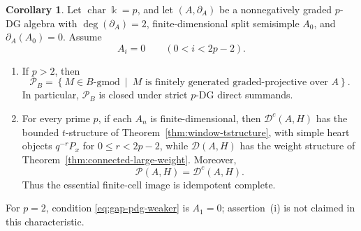 \documentclass[11pt]{article}
\theoremstyle{definition}
\newtheorem{cor}[thm]{Corollary}
\numberwithin{equation}{section}
\newcommand{\kk}{\Bbbk}
\newcommand{\Tcat}{\mathcal{P}(A,H)}
\newcommand{\Dc}{\mathcal{D}^c(A,H)}
\newcommand{\Der}{\mathcal{D}}
\begin{document}
\begin{cor}\label{cor:gap-pdg-weaker}
Let $\operatorname{char}\kk=p$, and let $(A,\partial_A)$ be a nonnegatively graded $p$-DG algebra with $\deg(\partial_A)=2$, finite-dimensional split semisimple $A_0$, and $\partial_A(A_0)=0$. Assume
\begin{equation}\label{eq:gap-pdg-weaker}
 A_i=0\qquad(0<i<2p-2).
\end{equation}
\begin{enumerate}
\item[(i)] If $p>2$, then
$$
\mathcal P_B
=
\left\{
M\in B\text{-gmod}\ \middle|\ 
M \text{ is finitely generated graded-projective over }A
\right\}.
$$
In particular, $\mathcal P_B$ is closed under strict $p$-DG direct summands.

\item[(ii)] For every prime $p$, if each $A_n$ is finite-dimensional, then
$\Dc$ has the bounded $t$-structure of
Theorem~\ref{thm:window-tstructure}, with simple heart objects
$q^{-r}P_x$ for $0\le r<2p-2$, while $\Der(A,H)$ has the weight
structure of Theorem~\ref{thm:connected-large-weight}.  Moreover,
\begin{equation}\label{eq:gap-pdg-weaker-derived}
 \Tcat=\Dc.
 \end{equation}
Thus the essential finite-cell image is idempotent complete. 
\end{enumerate}
\end{cor}

For $p=2$, condition \eqref{eq:gap-pdg-weaker} is $A_1=0$;
assertion~\textup{(i)} is not claimed in this characteristic.
\end{document}
